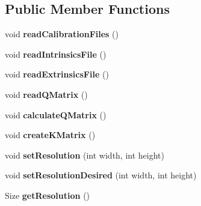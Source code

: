 \subsection*{Public Member Functions}
\begin{DoxyCompactItemize}
\item 
void {\bfseries read\+Calibration\+Files} ()\hypertarget{class_stereo_calib_a7525eb679794c618f5ddcda6037e154b}{}\label{class_stereo_calib_a7525eb679794c618f5ddcda6037e154b}

\item 
void {\bfseries read\+Intrinsics\+File} ()\hypertarget{class_stereo_calib_a971022931e4d6b3b48b766be554d03cc}{}\label{class_stereo_calib_a971022931e4d6b3b48b766be554d03cc}

\item 
void {\bfseries read\+Extrinsics\+File} ()\hypertarget{class_stereo_calib_a0c2402c9b8e192a2ec0f2005f223edec}{}\label{class_stereo_calib_a0c2402c9b8e192a2ec0f2005f223edec}

\item 
void {\bfseries read\+Q\+Matrix} ()\hypertarget{class_stereo_calib_a08b4daae32b930adc074f690f0af8f88}{}\label{class_stereo_calib_a08b4daae32b930adc074f690f0af8f88}

\item 
void {\bfseries calculate\+Q\+Matrix} ()\hypertarget{class_stereo_calib_afd8ad54a5076d898b567330185e6d3f3}{}\label{class_stereo_calib_afd8ad54a5076d898b567330185e6d3f3}

\item 
void {\bfseries create\+K\+Matrix} ()\hypertarget{class_stereo_calib_aea6e162e441033fad575cad449f43ecb}{}\label{class_stereo_calib_aea6e162e441033fad575cad449f43ecb}

\item 
void {\bfseries set\+Resolution} (int width, int height)\hypertarget{class_stereo_calib_a24699e443d80f5fdf3ec5503427ff129}{}\label{class_stereo_calib_a24699e443d80f5fdf3ec5503427ff129}

\item 
void {\bfseries set\+Resolution\+Desired} (int width, int height)\hypertarget{class_stereo_calib_aea0ba39cbf27b07d28ff4e5ae0913527}{}\label{class_stereo_calib_aea0ba39cbf27b07d28ff4e5ae0913527}

\item 
Size {\bfseries get\+Resolution} ()\hypertarget{class_stereo_calib_aa4d979e92c08c3ccd765b06c11348fba}{}\label{class_stereo_calib_aa4d979e92c08c3ccd765b06c11348fba}


\end{DoxyCompactItemize}
